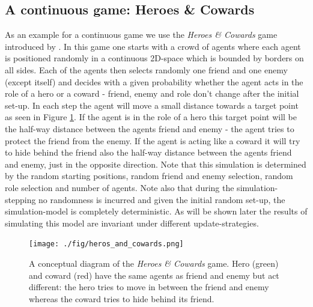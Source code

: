 \subsection{A continuous game: Heroes \& Cowards}
As an example for a continuous game we use the \textit{Heroes \& Cowards} game introduced by \cite{wilensky_introduction_2015}. In this game one starts with a crowd of agents where each agent is positioned randomly in a continuous 2D-space which is bounded by borders on all sides. Each of the agents then selects randomly one friend and one enemy (except itself) and decides with a given probability whether the agent acts in the role of a hero or a coward - friend, enemy and role don't change after the initial set-up. In each step the agent will move a small distance towards a target point as seen in Figure \ref{fig:heros_and_cowards}. If the agent is in the role of a hero this target point will be the half-way distance between the agents friend and enemy - the agent tries to protect the friend from the enemy. If the agent is acting like a coward it will try to hide behind the friend also the half-way distance between the agents friend and enemy, just in the opposite direction. Note that this simulation is determined by the random starting positions, random friend and enemy selection, random role selection and number of agents. Note also that during the simulation-stepping no randomness is incurred and given the initial random set-up, the simulation-model is completely deterministic. As will be shown later the results of simulating this model are invariant under different update-strategies.

\begin{figure}
	\centering
	\texttt{[image: ./fig/heros\_and\_cowards.png]}
	\caption{A conceptual diagram of the \textit{Heroes \& Cowards} game. Hero (green) and coward (red) have the same agents as friend and enemy but act different: the hero tries to move in between the friend and enemy whereas the coward tries to hide behind its friend.}
	\label{fig:heros_and_cowards}
\end{figure}

